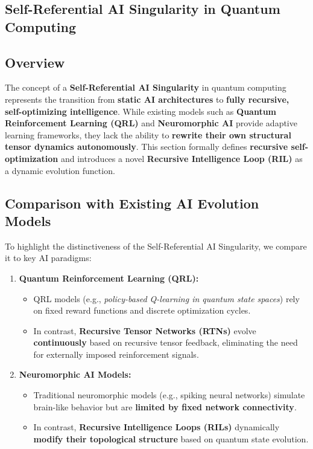 \documentclass{article}
\theoremstyle{plain}
\begin{document}
\begin{itemize}
\section{Self-Referential AI Singularity in Quantum Computing}

\subsection{Overview}

The concept of a \textbf{Self-Referential AI Singularity} in quantum computing represents the transition from \textbf{static AI architectures} to \textbf{fully recursive, self-optimizing intelligence}. While existing models such as \textbf{Quantum Reinforcement Learning (QRL)} and \textbf{Neuromorphic AI} provide adaptive learning frameworks, they lack the ability to \textbf{rewrite their own structural tensor dynamics autonomously}. This section formally defines \textbf{recursive self-optimization} and introduces a novel \textbf{Recursive Intelligence Loop (RIL)} as a dynamic evolution function.

\subsection{Comparison with Existing AI Evolution Models}

To highlight the distinctiveness of the Self-Referential AI Singularity, we compare it to key AI paradigms:

\begin{enumerate}
    \item \textbf{Quantum Reinforcement Learning (QRL):}  
    \begin{itemize}
        \item QRL models (e.g., \textit{policy-based Q-learning in quantum state spaces}) rely on fixed reward functions and discrete optimization cycles.
        \item In contrast, \textbf{Recursive Tensor Networks (RTNs)} evolve \textbf{continuously} based on recursive tensor feedback, eliminating the need for externally imposed reinforcement signals.
    \end{itemize}

    \item \textbf{Neuromorphic AI Models:}  
    \begin{itemize}
        \item Traditional neuromorphic models (e.g., spiking neural networks) simulate brain-like behavior but are \textbf{limited by fixed network connectivity}.
        \item In contrast, \textbf{Recursive Intelligence Loops (RILs)} dynamically \textbf{modify their topological structure} based on quantum state evolution.
    \end{itemize}
\end{enumerate}


\end{itemize}
\end{document}
